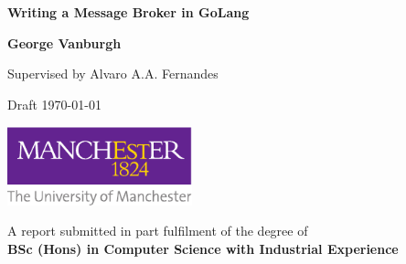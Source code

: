 \documentclass[a4paper,12pt,titlepage]{report}
\begin{document}
  
  

  \begin{titlepage}
    \begin{center}
        \vspace*{1cm}

        \Huge
        \textbf{Writing a Message Broker in GoLang}

        \vspace{2.0cm}
        \LARGE

        \textbf{George Vanburgh}

        \vspace{0.5cm}
        Supervised by Alvaro A.A. Fernandes

        \vspace{0.5cm}
        Draft \today

        \vfill

        \includegraphics[width=0.4\textwidth]{figures/manchesterLogo}

        \vspace{0.8cm}
        \large

        A report submitted in part fulfilment of the degree of \\
        \textbf{BSc (Hons) in Computer Science with Industrial Experience}

    \end{center}
  \end{titlepage}

  \begin{abstract}
    
  \end{abstract}

  \renewcommand{\abstractname}{Acknowledgements}
  \begin{abstract}
  \end{abstract}

  \tableofcontents
  \begin{versionhistory}
  \end{versionhistory}
\end{document}
